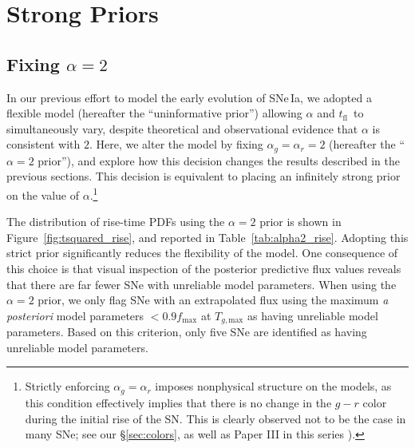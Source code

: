 \documentclass[twocolumn]{./aastex63}
\newcommand{\tfl}{$t_\mathrm{fl}$}
\begin{document}
\section{Strong Priors}\label{sec:strong_priors}

\subsection{Fixing $\alpha = 2$}

In our previous effort to model the early evolution of SNe\,Ia, we adopted a
flexible model (hereafter the ``uninformative prior'') allowing $\alpha$ and
\tfl\ to simultaneously vary, despite theoretical \citep{Arnett82,Riess99a}
and observational \citep{Conley06,Hayden10,Ganeshalingam11,Gonzalez-Gaitan12}
evidence that $\alpha$ is consistent with $2$. Here, we alter the model by
fixing $\alpha_g = \alpha_r = 2$ (hereafter the ``$\alpha = 2$ prior''), and
explore how this decision changes the results described in the previous
sections. This decision is equivalent to placing an infinitely strong prior on
the value of $\alpha$.\footnote{Strictly enforcing $\alpha_g = \alpha_r$
imposes nonphysical structure on the models, as this condition effectively
implies that there is no change in the $g - r$ color during the initial rise
of the SN. This is clearly observed not to be the case in many SNe; see our 
\S\ref{sec:colors}, as well as Paper III in this series \citep{Bulla20}).}

The distribution of rise-time PDFs using the $\alpha = 2$ prior is shown in
Figure~\ref{fig:tsquared_rise}, and reported in Table~\ref{tab:alpha2_rise}.
Adopting this strict prior significantly reduces the flexibility of the model.
One consequence of this choice is that visual inspection of the posterior
predictive flux values reveals that there are far fewer SNe with unreliable
model parameters. When using the $\alpha = 2$ prior, we only flag SNe with an
extrapolated flux using the maximum \textit{a posteriori} model parameters $<
0.9 f_\mathrm{max}$ at $T_{g,\mathrm{max}}$ as having unreliable model
parameters. Based on this criterion, only five SNe are identified as having
unreliable model parameters.


\end{document}
